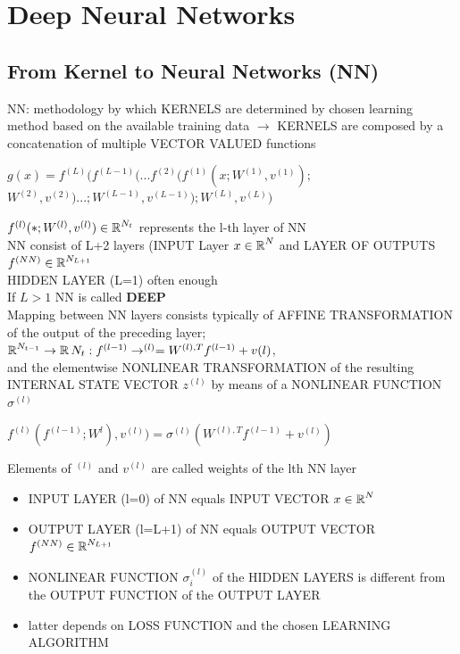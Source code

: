 
\section{Deep Neural Networks}
\begin{sectionbox}
\subsection{From Kernel to Neural Networks (NN)}
NN: methodology by which KERNELS are determined by chosen learning method based on the available training data $\rightarrow$ KERNELS are composed by a concatenation of multiple VECTOR VALUED functions
\begin{emphbox}
$g(x)=f^{(L)}(f^{(L-1)}(...f^{(2)}(f^{(1)}(x;W^{(1)},v^{(1)});$\\
$W^{(2)},v^{(2)})...;W^{(L-1)},v^{(L-1)});W^{(L)},v^{(L)})$
\end{emphbox}
$f^{(l)}(*;W^{(l)},v^{(l)})\in \operatorname{\mathbb R}^{N_t}$ represents the l-th layer of NN\\
NN consist of L+2 layers (INPUT Layer $x \in \operatorname{\mathbb R}^N$ and LAYER OF OUTPUTS $f^{(NN)}\in \operatorname{\mathbb R}^{N_{L+1}}$\\
HIDDEN LAYER (L=1) often enough\\
If $L>1$ NN is called \textbf{DEEP}\\

Mapping between NN layers consists typically of AFFINE TRANSFORMATION of the output of the preceding layer;\\
$\operatorname{\mathbb R}^{N_{t-1}}\rightarrow \operatorname{\mathbb R}{N_t}:f^{(l-1)} \rightarrow^{(l)}=W^{(l),T}f^{(l-1)}+v{(l)}$,\\
and the elementwise NONLINEAR TRANSFORMATION of the resulting INTERNAL STATE VECTOR $z^{(l)}$ by means of a NONLINEAR FUNCTION $\sigma^{(l)}$\\

\begin{emphbox}
$f^{(l)}(f^{(l-1)};W^{l}),v^{(l)})=\sigma^{(l)}(W^{(l),T}f^{(l-1)}+v^{(l)})$
\end{emphbox}

Elements of $^{(l)}$ and $v^{(l)}$ are called weights of the lth NN layer
\begin{itemize}
\item INPUT LAYER (l=0) of NN equals INPUT VECTOR $x \in \operatorname{\mathbb R}^N$
\item OUTPUT LAYER (l=L+1) of NN equals OUTPUT VECTOR $f^{(NN)}\in \operatorname{\mathbb R}^{N_{L+1}}$
\item NONLINEAR FUNCTION $\sigma_i^{(l)}$ of the HIDDEN LAYERS is different from the OUTPUT FUNCTION of the OUTPUT LAYER
\item latter depends on LOSS FUNCTION and the chosen LEARNING ALGORITHM
\end{itemize}


\end{sectionbox}
